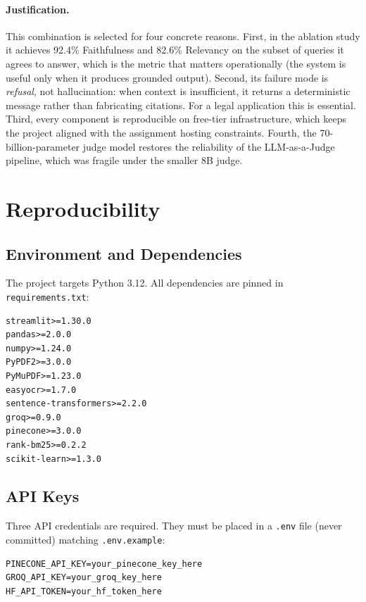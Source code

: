 \documentclass[11pt,a4paper]{article}
\begin{document}
\paragraph{Justification.}
This combination is selected for four concrete reasons. First, in the ablation study it achieves 92.4\% Faithfulness and 82.6\% Relevancy on the subset of queries it agrees to answer, which is the metric that matters operationally (the system is useful only when it produces grounded output). Second, its failure mode is \emph{refusal}, not hallucination: when context is insufficient, it returns a deterministic message rather than fabricating citations. For a legal application this is essential. Third, every component is reproducible on free-tier infrastructure, which keeps the project aligned with the assignment hosting constraints. Fourth, the 70-billion-parameter judge model restores the reliability of the LLM-as-a-Judge pipeline, which was fragile under the smaller 8B judge.

\newpage
\section{Reproducibility}
\label{sec:reproducibility}

\subsection{Environment and Dependencies}

The project targets Python 3.12. All dependencies are pinned in \texttt{requirements.txt}:

\begin{lstlisting}[language=promptlang]
streamlit>=1.30.0
pandas>=2.0.0
numpy>=1.24.0
PyPDF2>=3.0.0
PyMuPDF>=1.23.0
easyocr>=1.7.0
sentence-transformers>=2.2.0
groq>=0.9.0
pinecone>=3.0.0
rank-bm25>=0.2.2
scikit-learn>=1.3.0
\end{lstlisting}

\subsection{API Keys}

Three API credentials are required. They must be placed in a \texttt{.env} file (never committed) matching \texttt{.env.example}:

\begin{lstlisting}[language=promptlang]
PINECONE_API_KEY=your_pinecone_key_here
GROQ_API_KEY=your_groq_key_here
HF_API_TOKEN=your_hf_token_here
\end{lstlisting}
\end{document}

